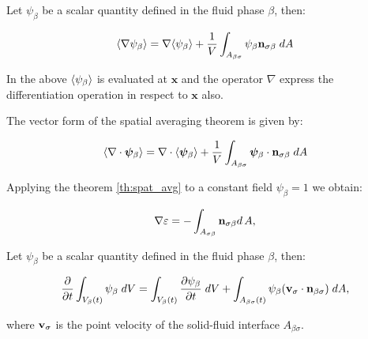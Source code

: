 \begin{theorem}
Let $\psi_{\beta}$ be a scalar quantity defined in the fluid phase $\beta$, then:

	\begin{equation}
		{\left< \nabla \psi_{\beta} \right>} = \nabla {\left< \psi_{\beta} \right>} + \dfrac{1}{V} \int_{A_{\beta \sigma}} \psi_{\beta} \mathbf{n}_{\sigma \beta}   \;dA
			\label{th:spat_avg}
	\end{equation}
\end{theorem}

In the above ${\left< \psi_{\beta} \right>}$ is evaluated at $\mathbf{x}$ and the operator $\nabla$ express the differentiation operation in respect to $\mathbf{x}$ also.

\begin{corollary}
	The vector form of the spatial averaging theorem is given by:
	
	\begin{equation}
	{\left< \nabla \cdot \boldsymbol{\psi}_{\beta} \right>} = \nabla \cdot {\left<  \boldsymbol{\psi}_{\beta} \right>} + \dfrac{1}{V} \int_{A_{\beta \sigma}}  \boldsymbol{\psi}_{\beta} \cdot \mathbf{n}_{\sigma \beta} \;dA
			\label{th:vec_spat_avg}
	\end{equation}
\end{corollary}

\begin{corollary}
	Applying the theorem \ref{th:spat_avg} to a constant field $\psi_{\beta} = 1$ we obtain:
	
	\begin{equation}
		\nabla \varepsilon = - \int_{A_{\sigma \beta}} \mathbf{n}_{\sigma \beta} d \, A,
	\end{equation}
\end{corollary}


\begin{theorem}
	Let $\psi_{\beta}$ be a scalar quantity defined in the fluid phase $\beta$, then:
	
	\begin{equation}
	\dfrac{\partial}{\partial t} \int_{V_\beta(t)} \psi_{\beta} \; dV =  \int_{V_\beta(t)} \dfrac{\partial \psi_{\beta}}{\partial t} \; dV + \int_{A_{\beta \sigma}(t)} \psi_{\beta} (\textbf{v}_{\sigma} \cdot \mathbf{n}_{\beta \sigma} ) \;dA,
	\label{th:transport}
	\end{equation}
	
	where $\textbf{v}_{\sigma}$ is the point velocity of the solid-fluid interface $A_{\beta \sigma}$.
\end{theorem}


